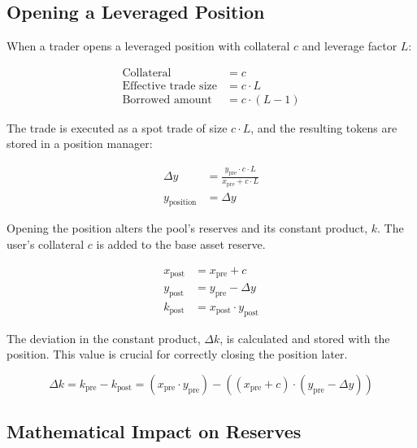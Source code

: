 \documentclass[11pt]{article}
\begin{document}
\subsection{Opening a Leveraged Position}

When a trader opens a leveraged position with collateral $c$ and leverage factor $L$:

\begin{equation}
\begin{aligned}
\text{Collateral} &= c \\
\text{Effective trade size} &= c \cdot L \\
\text{Borrowed amount} &= c \cdot (L - 1)
\end{aligned}
\end{equation}

The trade is executed as a spot trade of size $c \cdot L$, and the resulting tokens are stored in a position manager:

\begin{equation}
\begin{aligned}
\Delta y &= \frac{y_{\text{pre}} \cdot c \cdot L}{x_{\text{pre}} + c \cdot L} \\
y_{\text{position}} &= \Delta y
\end{aligned}
\end{equation}

Opening the position alters the pool's reserves and its constant product, $k$. The user's collateral $c$ is added to the base asset reserve.

\begin{equation}
\begin{aligned}
x_{\text{post}} &= x_{\text{pre}} + c \\
y_{\text{post}} &= y_{\text{pre}} - \Delta y \\
k_{\text{post}} &= x_{\text{post}} \cdot y_{\text{post}}
\end{aligned}
\end{equation}

The deviation in the constant product, $\Delta k$, is calculated and stored with the position. This value is crucial for correctly closing the position later.

\begin{equation}
\Delta k = k_{\text{pre}} - k_{\text{post}} = (x_{\text{pre}} \cdot y_{\text{pre}}) - ((x_{\text{pre}} + c) \cdot (y_{\text{pre}} - \Delta y))
\end{equation}

\subsection{Mathematical Impact on Reserves}
\end{document}

